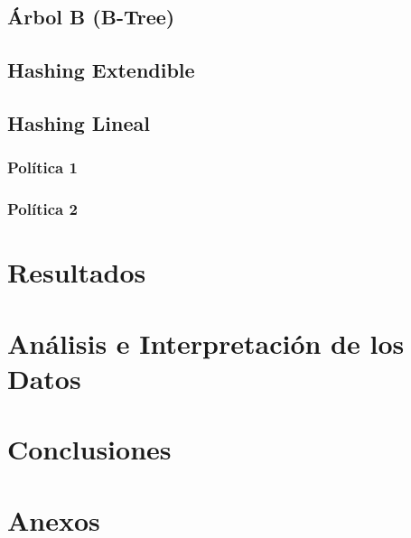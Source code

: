 \documentclass[12pt,letterpaper]{report}
\begin{document}
\subsection{Árbol B (B-Tree)}

\subsection{Hashing Extendible}
\subsection{Hashing Lineal}
\subsubsection{Política 1}
\subsubsection{Política 2}

\section{Resultados}

\section{Análisis e Interpretación de los Datos}

\section{Conclusiones}

\section{Anexos}
\end{document}
